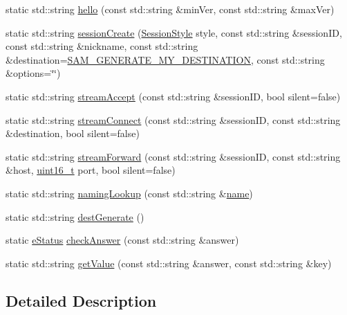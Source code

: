 \begin{DoxyCompactItemize}
\item 
static std\+::string \hyperlink{class_s_a_m_1_1_message_a586e92a2047246d9bc1d54b2fe184531}{hello} (const std\+::string \&min\+Ver, const std\+::string \&max\+Ver)
\item 
static std\+::string \hyperlink{class_s_a_m_1_1_message_a48370ea8f0b6990e7182ffeef5672a9a}{session\+Create} (\hyperlink{class_s_a_m_1_1_message_aa83727780ef088263c251feef048a4d5}{Session\+Style} style, const std\+::string \&session\+I\+D, const std\+::string \&nickname, const std\+::string \&destination=\hyperlink{i2psam_8h_a7106d11b70e8d692b4f3ee6cbac5d1f1}{S\+A\+M\+\_\+\+G\+E\+N\+E\+R\+A\+T\+E\+\_\+\+M\+Y\+\_\+\+D\+E\+S\+T\+I\+N\+A\+T\+I\+O\+N}, const std\+::string \&options=\char`\"{}\char`\"{})
\item 
static std\+::string \hyperlink{class_s_a_m_1_1_message_a2b4f1f665af4d53cdb21edf138d531e4}{stream\+Accept} (const std\+::string \&session\+I\+D, bool silent=false)
\item 
static std\+::string \hyperlink{class_s_a_m_1_1_message_a27daf74a6a683c28b239de366ae02a8f}{stream\+Connect} (const std\+::string \&session\+I\+D, const std\+::string \&destination, bool silent=false)
\item 
static std\+::string \hyperlink{class_s_a_m_1_1_message_a3ec2da4e4b3649416637154ca6e9938b}{stream\+Forward} (const std\+::string \&session\+I\+D, const std\+::string \&host, \hyperlink{stdint_8h_a273cf69d639a59973b6019625df33e30}{uint16\+\_\+t} port, bool silent=false)
\item 
static std\+::string \hyperlink{class_s_a_m_1_1_message_a4c8f89d31339e18137960a70cbbc902d}{naming\+Lookup} (const std\+::string \&\hyperlink{testharness_8cc_a8f8f80d37794cde9472343e4487ba3eb}{name})
\item 
static std\+::string \hyperlink{class_s_a_m_1_1_message_a6c454eb827a3ba8d5b6cb842b5ff23b7}{dest\+Generate} ()
\item 
static \hyperlink{class_s_a_m_1_1_message_a5f7e317defb90f107fc1a017a4552ae9}{e\+Status} \hyperlink{class_s_a_m_1_1_message_a1d976198d4f36ab56f838f560d536d37}{check\+Answer} (const std\+::string \&answer)
\item 
static std\+::string \hyperlink{class_s_a_m_1_1_message_a134481a97dd531c7e5e11aeff965ea6c}{get\+Value} (const std\+::string \&answer, const std\+::string \&key)
\end{DoxyCompactItemize}


\subsection{Detailed Description}


